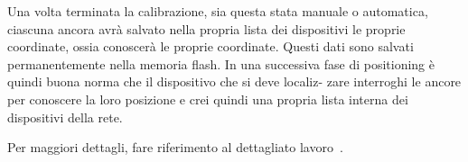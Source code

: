 Una volta terminata la calibrazione, sia questa stata manuale o automatica, ciascuna ancora avrà
salvato nella propria lista dei dispositivi le proprie coordinate, ossia conoscerà le proprie coordinate. 
Questi dati sono salvati permanentemente nella memoria flash.
In una successiva fase di positioning è quindi buona norma che il dispositivo che si deve localiz-
zare interroghi le ancore per conoscere la loro posizione e crei quindi una propria lista interna dei
dispositivi della rete.


Per maggiori dettagli, fare riferimento al dettagliato lavoro~\cite{ctesconistudio}.

\newpage



